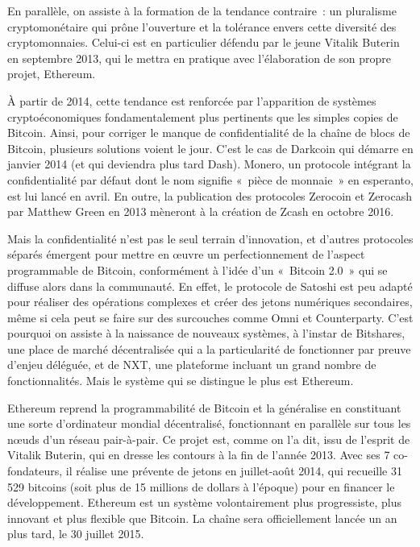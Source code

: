 En parallèle, on assiste à la formation de la tendance contraire~: un pluralisme cryptomonétaire qui prône l'ouverture et la tolérance envers cette diversité des cryptomonnaies. Celui-ci est en particulier défendu par le jeune Vitalik Buterin en septembre 2013, qui le mettra en pratique avec l'élaboration de son propre projet, Ethereum.

À partir de 2014, cette tendance est renforcée par l'apparition de systèmes cryptoéconomiques fondamentalement plus pertinents que les simples copies de Bitcoin. Ainsi, pour corriger le manque de confidentialité de la chaîne de blocs de Bitcoin, plusieurs solutions voient le jour. C'est le cas de Darkcoin qui démarre en janvier 2014 (et qui deviendra plus tard Dash). Monero, un protocole intégrant la confidentialité par défaut dont le nom signifie «~pièce de monnaie~» en esperanto, est lui lancé en avril. En outre, la publication des protocoles Zerocoin et Zerocash par Matthew Green en 2013 mèneront à la création de Zcash en octobre 2016.

Mais la confidentialité n'est pas le seul terrain d'innovation, et d'autres protocoles séparés émergent pour mettre en œuvre un perfectionnement de l'aspect programmable de Bitcoin, conformément à l'idée d'un «~Bitcoin 2.0~» qui se diffuse alors dans la communauté. En effet, le protocole de Satoshi est peu adapté pour réaliser des opérations complexes et créer des jetons numériques secondaires, même si cela peut se faire sur des surcouches comme Omni et Counterparty. C'est pourquoi on assiste à la naissance de nouveaux systèmes, à l'instar de Bitshares, une place de marché décentralisée qui a la particularité de fonctionner par preuve d'enjeu déléguée, et de NXT, une plateforme incluant un grand nombre de fonctionnalités. Mais le système qui se distingue le plus est Ethereum.

Ethereum reprend la programmabilité de Bitcoin et la généralise en constituant une sorte d'ordinateur mondial décentralisé, fonctionnant en parallèle sur tous les nœuds d'un réseau pair-à-pair. Ce projet est, comme on l'a dit, issu de l'esprit de Vitalik Buterin, qui en dresse les contours à la fin de l'année 2013. Avec ses 7 co-fondateurs, il réalise une prévente de jetons en juillet-août 2014, qui recueille 31 529 bitcoins (soit plus de 15 millions de dollars à l'époque) pour en financer le développement. Ethereum est un système volontairement plus progressiste, plus innovant et plus flexible que Bitcoin. La chaîne sera officiellement lancée un an plus tard, le 30 juillet 2015.

